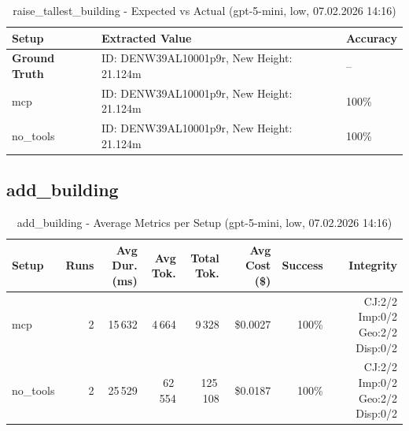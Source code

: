 \documentclass[a4paper,11pt]{article}
\begin{document}
\begin{table}[H]
\centering
\scriptsize
\caption{raise\_tallest\_building - Detailed Runs Comparison (gpt-5-mini, low, 07.02.2026 14:16)}
\end{table}

\begin{table}[H]
\centering
\scriptsize
\caption{raise\_tallest\_building - Expected vs Actual (gpt-5-mini, low, 07.02.2026 14:16)}
\begin{tabular}{l l l}
\toprule
Setup & Extracted Value & Accuracy \\
\midrule
\textbf{Ground Truth} & ID: DENW39AL10001p9r, New Height: 21.124m & -- \\
\midrule
mcp & ID: DENW39AL10001p9r, New Height: 21.124m & 100\% \\
no\_tools & ID: DENW39AL10001p9r, New Height: 21.124m & 100\% \\
\bottomrule
\end{tabular}
\end{table}

\clearpage

\subsection{add\_building}

\begin{table}[H]
\centering
\scriptsize
\caption{add\_building - Average Metrics per Setup (gpt-5-mini, low, 07.02.2026 14:16)}
\label{tab:combined\_add\_building\_metrics\_20260207}
\begin{tabular}{l r r r r r r r}
\toprule
Setup & Runs & Avg Dur. (ms) & Avg Tok. & Total Tok. & Avg Cost (\$) & Success & Integrity \\
\midrule
mcp & 2 & 15\,632 & 4\,664 & 9\,328 & \$0.0027 & 100\% & CJ:2/2 Imp:0/2 Geo:2/2 Disp:0/2 \\
no\_tools & 2 & 25\,529 & 62\,554 & 125\,108 & \$0.0187 & 100\% & CJ:2/2 Imp:0/2 Geo:2/2 Disp:0/2 \\
\bottomrule
\end{tabular}
\end{table}
\end{document}
